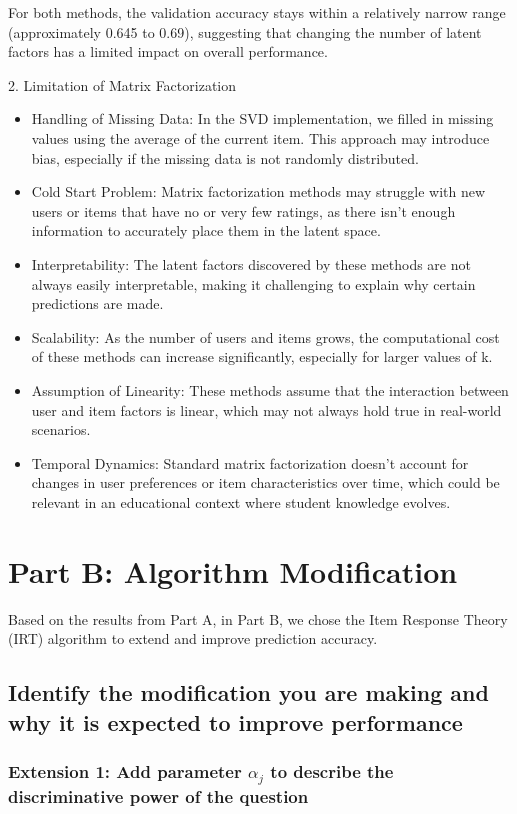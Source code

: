 \documentclass{article}
\begin{document}
For both methods, the validation accuracy stays within a relatively narrow range (approximately 0.645 to 0.69), suggesting that changing the number of latent factors has a limited impact on overall performance.

2. Limitation of Matrix Factorization

\begin{itemize}
\item Handling of Missing Data: In the SVD implementation, we filled in missing values using the average of the current item. This approach may introduce bias, especially if the missing data is not randomly distributed.
\item Cold Start Problem: Matrix factorization methods may struggle with new users or items that have no or very few ratings, as there isn't enough information to accurately place them in the latent space.
\item Interpretability: The latent factors discovered by these methods are not always easily interpretable, making it challenging to explain why certain predictions are made.
\item Scalability: As the number of users and items grows, the computational cost of these methods can increase significantly, especially for larger values of k.
\item Assumption of Linearity: These methods assume that the interaction between user and item factors is linear, which may not always hold true in real-world scenarios.
\item Temporal Dynamics: Standard matrix factorization doesn't account for changes in user preferences or item characteristics over time, which could be relevant in an educational context where student knowledge evolves.
\end{itemize}

\section{Part B: Algorithm Modification}

Based on the results from Part A, in Part B, we chose the Item Response Theory (IRT) algorithm to extend and improve prediction accuracy.

\subsection{Identify the modification you are making and why it is expected to improve performance}

\subsubsection{Extension 1: Add parameter $\alpha_j$ to describe the discriminative power of the question}
\end{document}
